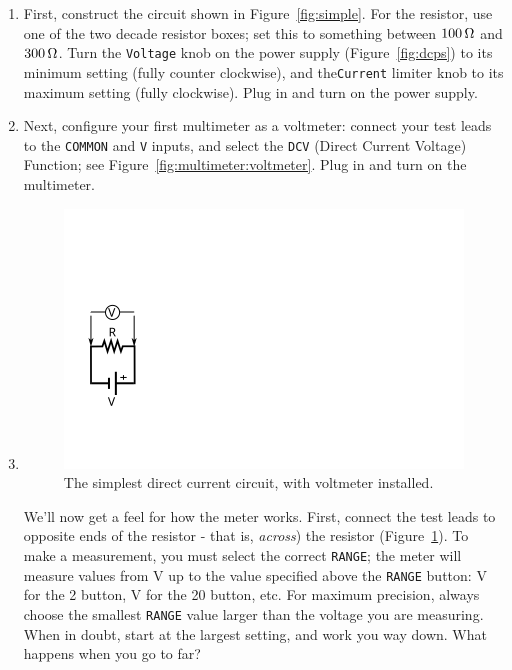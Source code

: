 \documentclass[12pt]{article}
\begin{document}
\begin{enumerate}
\item First, construct the circuit shown in Figure~\ref{fig:simple}.
  For the resistor, use one of the two decade resistor boxes; set this
  to something between $\unit[100]{\Omega}$ and
  $\unit[300]{\Omega}$.  Turn
  the \texttt{Voltage} knob on the power supply
  (Figure~\ref{fig:dcps}) to its minimum setting (fully counter
  clockwise), and the\texttt{Current} limiter knob to its maximum
  setting (fully clockwise).  Plug in and turn on the power supply.
\item Next, configure your first multimeter as a voltmeter: connect
  your test leads to the \texttt{COMMON} and \texttt{V} inputs, and
  select the \texttt{DCV} (Direct Current Voltage) Function; see
  Figure~\ref{fig:multimeter:voltmeter}.  Plug in and turn on the
  multimeter.
\item 
  \begin{figure}
    \centering
    \includegraphics[width=\textwidth/5]{figures/simplest_with_voltmeter}
    \caption{The simplest direct current circuit, with voltmeter installed.}
    \label{fig:simplest_with_voltmeter}
  \end{figure}
  We'll now get a feel for how the meter works.  First, connect the
  test leads to opposite ends of the resistor - that is,
  \textit{across}) the resistor
  (Figure~\ref{fig:simplest_with_voltmeter}).  To make a measurement,
  you must select the correct \texttt{RANGE}; the meter will measure
  values from \unit[0]{V} up to the value specified above the
  \texttt{RANGE} button: \unit[2]{V} for the 2 button, \unit[20]{V}
  for the 20 button, etc.  For maximum precision, always choose the
  smallest \texttt{RANGE} value larger than the voltage you are
  measuring.  When in doubt, start at the largest setting, and work
  you way down.  What happens when you go to far?


\end{enumerate}
\end{document}
